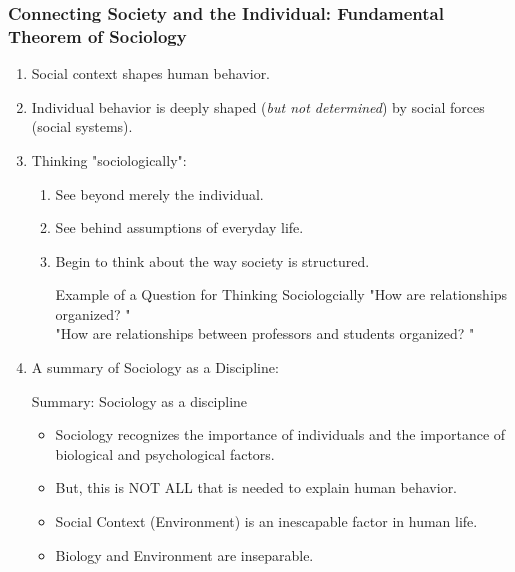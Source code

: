 \documentclass[12pt,a4paper]{article}
\begin{document}
\subsubsection{Connecting Society and the Individual: Fundamental Theorem of Sociology}
\begin{enumerate}
	\item Social context shapes human behavior. \\{\color{green}{Social context = Environment}}
	\item Individual behavior is deeply shaped (\textit{but not determined}) by social forces (social systems).
	\item Thinking "sociologically":
	\begin{enumerate}
		\item See beyond merely the individual.
		\item See behind assumptions of everyday life.
		\item Begin to think about the way society is structured. 
		\begin{eg}{Example of a Question for Thinking Sociologcially}
			"How are relationships organized? "\\
			"How are relationships between professors and students organized? "
		\end{eg}
	\end{enumerate}
	\item A summary of Sociology as a Discipline: 
	\begin{rmk}{Summary: Sociology as a discipline}
		\begin{itemize}
			\item Sociology recognizes the importance of individuals and the importance of biological and psychological factors.
			\item But, this is NOT ALL that is needed to explain human behavior.
			\item Social Context (Environment) is an inescapable factor in human life.
			\item Biology and Environment are inseparable.
		\end{itemize}
	\end{rmk}
\end{enumerate}
\end{document}
